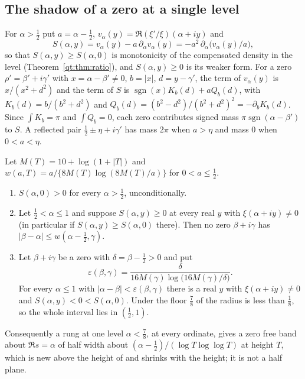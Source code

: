 \subsection{The shadow of a zero at a single level}\label{qt:sec:shadow}

For $\alpha>\tfrac12$ put $a=\alpha-\tfrac12$, $v_\alpha(y)=\Re(\xi'/\xi)(\alpha+iy)$ and
\[
S(\alpha,y)=v_\alpha(y)-a\,\partial_\alpha v_\alpha(y)=-a^2\,\partial_\alpha\big(v_\alpha(y)/a\big),
\]
so that $S(\alpha,y)\ge S(\alpha,0)$ is monotonicity of the compensated density in the level (Theorem~\ref{qt:thm:ratio}), and $S(\alpha,y)\ge0$ is its weaker form. For a zero $\rho'=\beta'+i\gamma'$ with $x=\alpha-\beta'\ne0$, $b=|x|$, $d=y-\gamma'$, the term of $v_\alpha(y)$ is $x/(x^2+d^2)$ and the term of $S$ is $\operatorname{sgn}(x)K_b(d)+aQ_b(d)$, with $K_b(d)=b/(b^2+d^2)$ and $Q_b(d)=(b^2-d^2)/(b^2+d^2)^2=-\partial_bK_b(d)$. Since $\int K_b=\pi$ and $\int Q_b=0$, each zero contributes signed mass $\pi\operatorname{sgn}(\alpha-\beta')$ to $S$. A reflected pair $\tfrac12\pm\eta+i\gamma'$ has mass $2\pi$ when $a>\eta$ and mass $0$ when $0<a<\eta$.

\begin{proposition}\label{qt:prop:shadow}
Let $M(T)=10+\log(1+|T|)$ and $w(a,T)=a/\{8M(T)\log(8M(T)/a)\}$ for $0<a\le\tfrac12$.
\begin{enumerate}
\item $S(\alpha,0)>0$ for every $\alpha>\tfrac12$, unconditionally.
\item Let $\tfrac12<\alpha\le1$ and suppose $S(\alpha,y)\ge0$ at every real $y$ with $\xi(\alpha+iy)\ne0$ (in particular if $S(\alpha,y)\ge S(\alpha,0)$ there). Then no zero $\beta+i\gamma$ has $|\beta-\alpha|\le w(\alpha-\tfrac12,\gamma)$.
\item Let $\beta+i\gamma$ be a zero with $\delta=\beta-\tfrac12>0$ and put
\[
\varepsilon(\beta,\gamma)=\frac{\delta}{16M(\gamma)\log\big(16M(\gamma)/\delta\big)}.
\]
For every $\alpha\le1$ with $|\alpha-\beta|<\varepsilon(\beta,\gamma)$ there is a real $y$ with $\xi(\alpha+iy)\ne0$ and $S(\alpha,y)<0<S(\alpha,0)$. Under the floor $\tfrac78$ of \cite{OAI26a} the radius is less than $\tfrac18$, so the whole interval lies in $(\tfrac12,1)$.
\end{enumerate}
Consequently a rung at one level $\alpha<\tfrac78$, at every ordinate, gives a zero free band about $\Re s=\alpha$ of half width about $(\alpha-\tfrac12)/(\log T\log\log T)$ at height $T$, which is new above the height of \cite{PT21} and shrinks with the height; it is not a half plane.
\end{proposition}

